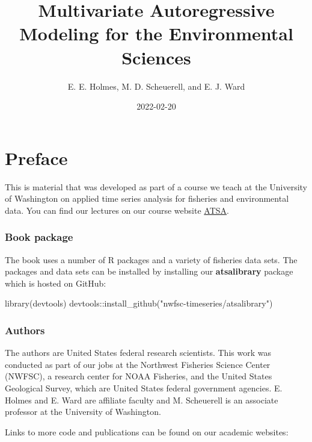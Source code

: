 \documentclass[
  12pt,
]{book}
\title{Multivariate Autoregressive Modeling for the Environmental Sciences}
\author{E. E. Holmes, M. D. Scheuerell, and E. J. Ward}
\date{2022-02-20}
\newenvironment{Shaded}{\begin{snugshade}}{\end{snugshade}}
\newcommand{\FunctionTok}[1]{\textcolor[rgb]{0.00,0.00,0.00}{#1}}
\newcommand{\NormalTok}[1]{#1}
\newcommand{\SpecialCharTok}[1]{\textcolor[rgb]{0.00,0.00,0.00}{#1}}
\newcommand{\StringTok}[1]{\textcolor[rgb]{0.31,0.60,0.02}{#1}}
\begin{document}
\maketitle

{
\setcounter{tocdepth}{1}
\tableofcontents
}
\hypertarget{preface}{%
\chapter*{Preface}\label{preface}}


This is material that was developed as part of a course we teach at the University of Washington on applied time series analysis for fisheries and environmental data. You can find our lectures on our course website \href{https://nwfsc-timeseries.github.io/atsa/}{ATSA}.

\hypertarget{book-package}{%
\subsection*{Book package}\label{book-package}}


The book uses a number of R packages and a variety of fisheries data sets. The packages and data sets can be installed by installing our \textbf{atsalibrary} package which is hosted on GitHub:

\begin{Shaded}
\begin{Highlighting}[]
\FunctionTok{library}\NormalTok{(devtools)}
\NormalTok{devtools}\SpecialCharTok{::}\FunctionTok{install\_github}\NormalTok{(}\StringTok{"nwfsc{-}timeseries/atsalibrary"}\NormalTok{)}
\end{Highlighting}
\end{Shaded}

\hypertarget{authors}{%
\subsection*{Authors}\label{authors}}


The authors are United States federal research scientists. This work was conducted as part of our jobs at the Northwest Fisheries Science Center (NWFSC), a research center for NOAA Fisheries, and the United States Geological Survey, which are United States federal government agencies. E. Holmes and E. Ward are affiliate faculty and M. Scheuerell is an associate professor at the University of Washington.

Links to more code and publications can be found on our academic websites:
\end{document}
